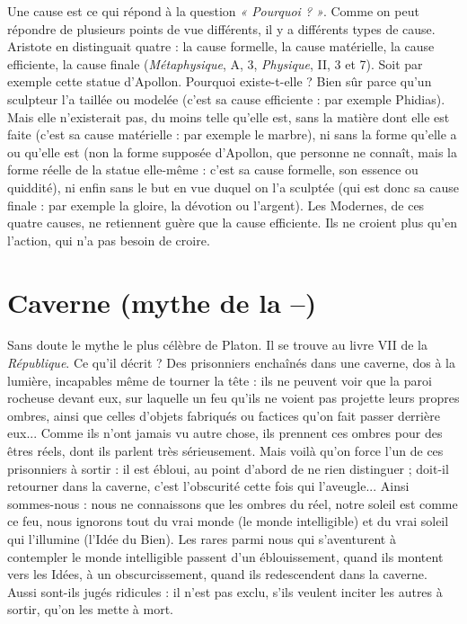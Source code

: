 Une cause est ce qui répond à la question {\it « Pourquoi ? »}. Comme on peut
répondre de plusieurs points de vue différents, il y a différents types de cause.
Aristote en distinguait quatre : la cause formelle, la cause matérielle, la cause
efficiente, la cause finale ({\it Métaphysique}, A, 3, {\it Physique}, II, 3 et 7). Soit par
exemple cette statue d’Apollon. Pourquoi existe-t-elle ? Bien sûr parce qu’un
sculpteur l’a taillée ou modelée (c’est sa cause efficiente : par exemple Phidias).
Mais elle n’existerait pas, du moins telle qu’elle est, sans la matière dont elle est
faite (c’est sa cause matérielle : par exemple le marbre), ni sans la forme qu’elle
a ou qu’elle est (non la forme supposée d’Apollon, que personne ne connaît,
mais la forme réelle de la statue elle-même : c’est sa cause formelle, son essence
ou quiddité), ni enfin sans le but en vue duquel on l’a sculptée (qui est donc sa
cause finale : par exemple la gloire, la dévotion ou l’argent). Les Modernes, de
ces quatre causes, ne retiennent guère que la cause efficiente. Ils ne croient plus
qu’en l’action, qui n’a pas besoin de croire.

\section{Caverne (mythe de la {\bf --})}
Sans doute le mythe le plus célèbre de
Platon. Il se trouve au livre VII de la {\it République}.
Ce qu’il décrit ? Des prisonniers enchaînés dans une caverne, dos à la
lumière, incapables même de tourner la tête : ils ne peuvent voir que la paroi
rocheuse devant eux, sur laquelle un feu qu’ils ne voient pas projette leurs
propres ombres, ainsi que celles d’objets fabriqués ou factices qu’on fait passer
derrière eux... Comme ils n’ont jamais vu autre chose, ils prennent ces ombres
pour des êtres réels, dont ils parlent très sérieusement. Mais voilà qu’on force
l'un de ces prisonniers à sortir : il est ébloui, au point d’abord de ne rien
distinguer ; doit-il retourner dans la caverne, c’est l’obscurité cette fois qui
l’aveugle... Ainsi sommes-nous : nous ne connaissons que les ombres du réel,
notre soleil est comme ce feu, nous ignorons tout du vrai monde (le monde
intelligible) et du vrai soleil qui l’illumine (l'Idée du Bien). Les rares parmi
nous qui s’aventurent à contempler le monde intelligible passent d’un éblouissement,
quand ils montent vers les Idées, à un obscurcissement, quand ils
redescendent dans la caverne. Aussi sont-ils jugés ridicules : il n’est pas exclu,
s'ils veulent inciter les autres à sortir, qu’on les mette à mort.

